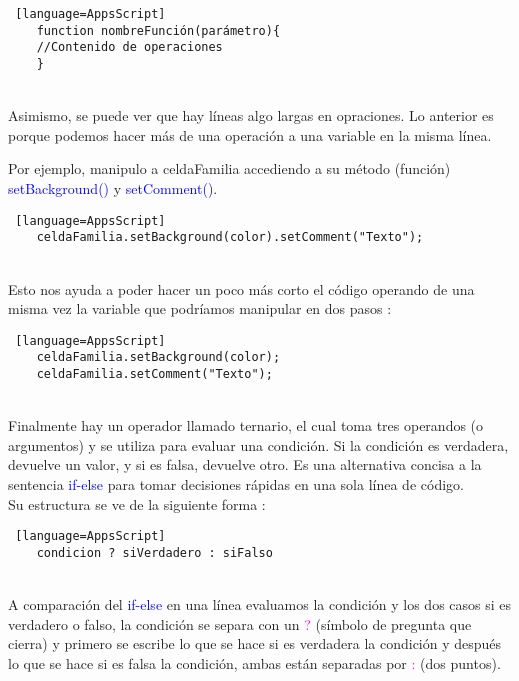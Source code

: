 \documentclass[12pt]{article} %
\begin{document}
    \begin{lstlisting} [language=AppsScript]
    function nombreFunción(parámetro){
    //Contenido de operaciones
    }
    \end{lstlisting} \\

    Asimismo, se puede ver que hay líneas algo largas en opraciones. Lo anterior es porque podemos hacer más de una operación a una variable en la misma línea.

    Por ejemplo, manipulo a celdaFamilia accediendo a su método (función) \textcolor{blue}{setBackground()} y \textcolor{blue}{setComment()}. \\

    \begin{lstlisting} [language=AppsScript]
    celdaFamilia.setBackground(color).setComment("Texto");
    \end{lstlisting} \\

    Esto nos ayuda a poder hacer un poco más corto el código operando de una misma vez la variable que podríamos manipular en dos pasos :\\

    \begin{lstlisting} [language=AppsScript]
    celdaFamilia.setBackground(color);
    celdaFamilia.setComment("Texto");
    \end{lstlisting} \\

    Finalmente hay un operador llamado ternario, el cual toma tres operandos (o argumentos) y se utiliza para evaluar una condición. Si la condición es verdadera, devuelve un valor, y si es falsa, devuelve otro. Es una alternativa concisa a la sentencia \textcolor{blue}{if-else} para tomar decisiones rápidas en una sola línea de código. \\

    Su estructura se ve de la siguiente forma :  \\
    
    \begin{lstlisting} [language=AppsScript]
    condicion ? siVerdadero : siFalso
    \end{lstlisting} \\

    A comparación del \textcolor{blue}{if-else} en una línea evaluamos la condición y los dos casos si es verdadero o falso, la condición se separa con un \textcolor{magenta}{?} (símbolo de pregunta que cierra) y primero se escribe lo que se hace si es verdadera la condición y después lo que se hace si es falsa la condición, ambas están separadas por \textcolor{magenta}{:} (dos puntos). \\
\end{document}
